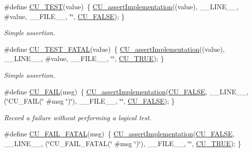 \begin{DoxyCompactItemize}
\#define \hyperlink{group__Framework_ga1b3da8721edd6a08963dcf471b34b81b}{C\-U\-\_\-\-T\-E\-S\-T}(value)~\{ \hyperlink{group__Framework_ga31a858e8b496b2af992b63902064c5fa}{C\-U\-\_\-assert\-Implementation}((value), \-\_\-\-\_\-\-L\-I\-N\-E\-\_\-\-\_\-, \#value, \-\_\-\-\_\-\-F\-I\-L\-E\-\_\-\-\_\-, \char`\"{}\char`\"{}, \hyperlink{group__Framework_ga7453214541b156ef868681eaafe60860}{C\-U\-\_\-\-F\-A\-L\-S\-E}); \}
\begin{DoxyCompactList}\small\item\em Simple assertion. \end{DoxyCompactList}\item 
\#define \hyperlink{group__Framework_ga0a2e279af06a9cd72e5b0faab7b3bbaf}{C\-U\-\_\-\-T\-E\-S\-T\-\_\-\-F\-A\-T\-A\-L}(value)~\{ \hyperlink{group__Framework_ga31a858e8b496b2af992b63902064c5fa}{C\-U\-\_\-assert\-Implementation}((value), \-\_\-\-\_\-\-L\-I\-N\-E\-\_\-\-\_\-, \#value, \-\_\-\-\_\-\-F\-I\-L\-E\-\_\-\-\_\-, \char`\"{}\char`\"{}, \hyperlink{group__Framework_ga99641394bc766ca9c4a295e942fed1ef}{C\-U\-\_\-\-T\-R\-U\-E}); \}
\begin{DoxyCompactList}\small\item\em Simple assertion. \end{DoxyCompactList}\item 
\#define \hyperlink{group__Framework_gabe35d38d86cb4472319bd83c3e2ab60b}{C\-U\-\_\-\-F\-A\-I\-L}(msg)~\{ \hyperlink{group__Framework_ga31a858e8b496b2af992b63902064c5fa}{C\-U\-\_\-assert\-Implementation}(\hyperlink{group__Framework_ga7453214541b156ef868681eaafe60860}{C\-U\-\_\-\-F\-A\-L\-S\-E}, \-\_\-\-\_\-\-L\-I\-N\-E\-\_\-\-\_\-, (\char`\"{}C\-U\-\_\-\-F\-A\-I\-L(\char`\"{} \#msg \char`\"{})\char`\"{}), \-\_\-\-\_\-\-F\-I\-L\-E\-\_\-\-\_\-, \char`\"{}\char`\"{}, \hyperlink{group__Framework_ga7453214541b156ef868681eaafe60860}{C\-U\-\_\-\-F\-A\-L\-S\-E}); \}
\begin{DoxyCompactList}\small\item\em Record a failure without performing a logical test. \end{DoxyCompactList}\item 
\#define \hyperlink{group__Framework_gaa318f5cbedfa0e23781eb69ef82b86de}{C\-U\-\_\-\-F\-A\-I\-L\-\_\-\-F\-A\-T\-A\-L}(msg)~\{ \hyperlink{group__Framework_ga31a858e8b496b2af992b63902064c5fa}{C\-U\-\_\-assert\-Implementation}(\hyperlink{group__Framework_ga7453214541b156ef868681eaafe60860}{C\-U\-\_\-\-F\-A\-L\-S\-E}, \-\_\-\-\_\-\-L\-I\-N\-E\-\_\-\-\_\-, (\char`\"{}C\-U\-\_\-\-F\-A\-I\-L\-\_\-\-F\-A\-T\-A\-L(\char`\"{} \#msg \char`\"{})\char`\"{}), \-\_\-\-\_\-\-F\-I\-L\-E\-\_\-\-\_\-, \char`\"{}\char`\"{}, \hyperlink{group__Framework_ga99641394bc766ca9c4a295e942fed1ef}{C\-U\-\_\-\-T\-R\-U\-E}); \}

\end{DoxyCompactItemize}
